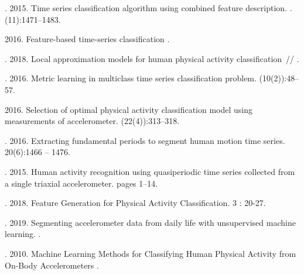 \documentclass[12pt, twoside]{article}
\begin{document}
\maketitleSecondary
\English
\begin{thebibliography}{99}

	. 2015.
	 Time series classification algorithm using combined feature description. .
	 (11):1471–1483.

	 2016.
	Feature-based time-series classification
	.
	
	. 2018.
	Local approximation models for human physical activity classification~//
	.

	. 2016.
	 Metric learning in multiclass time series classification problem.
	 (10(2)):48–57.

	 2016.
	 Selection of optimal physical activity classification model using measurements of accelerometer.
	  (22(4)):313–318.

	. 2016.
	 Extracting fundamental periods to segment human motion time series.
	  20(6):1466 – 1476.

	. 2015.
	 Human activity recognition using quasiperiodic time series collected from a single triaxial accelerometer.
	  pages 1–14.
	
	. 2018.
	Feature Generation for Physical Activity Classification.
	  3 : 20-27.

	. 2019.
	 Segmenting accelerometer data from daily life with unsupervised machine learning.
    .
    
    . 2010.
    Machine Learning Methods for Classifying Human Physical Activity from On-Body Accelerometers
    .
    

\end{thebibliography}
\end{document}

